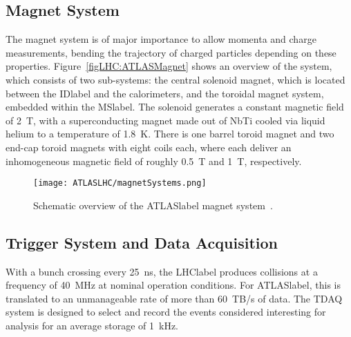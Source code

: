 \subsection{Magnet System}

The magnet system is of major importance to allow momenta and charge measurements, bending the trajectory of charged particles depending on these properties. Figure~\ref{figLHC:ATLASMagnet} shows an overview of the system, which consists of two sub-systems: the central solenoid magnet, which is located between the \acrshort{IDlabel} and the calorimeters, and the toroidal magnet system, embedded within the \acrshort{MSlabel}. The solenoid generates a constant magnetic field of 2~T, with a superconducting magnet made out of NbTi cooled via liquid helium to a temperature of 1.8~K. There is one barrel toroid magnet and two end-cap toroid magnets with eight coils each, where each deliver an inhomogeneous magnetic field of roughly 0.5~T and 1~T, respectively.

\begin{figure}[htbp]
    \RawFloats
    \begin{center}
    \texttt{[image: ATLASLHC/magnetSystems.png]}
    \caption{
        Schematic overview of the \acrshort{ATLASlabel} magnet system~\cite{JetGoodson}. 
    }
    \label{figLHC:ATLASMagnets}
    \end{center}
\end{figure}

\subsection{Trigger System and Data Acquisition}

With a bunch crossing every 25~ns, the \acrshort{LHClabel} produces collisions at a frequency of 40~MHz at nominal operation conditions. For \acrshort{ATLASlabel}, this is translated to an unmanageable rate of more than 60~TB/s of data. The TDAQ system is designed to select and record the events considered interesting for analysis for an average storage of 1~kHz.

